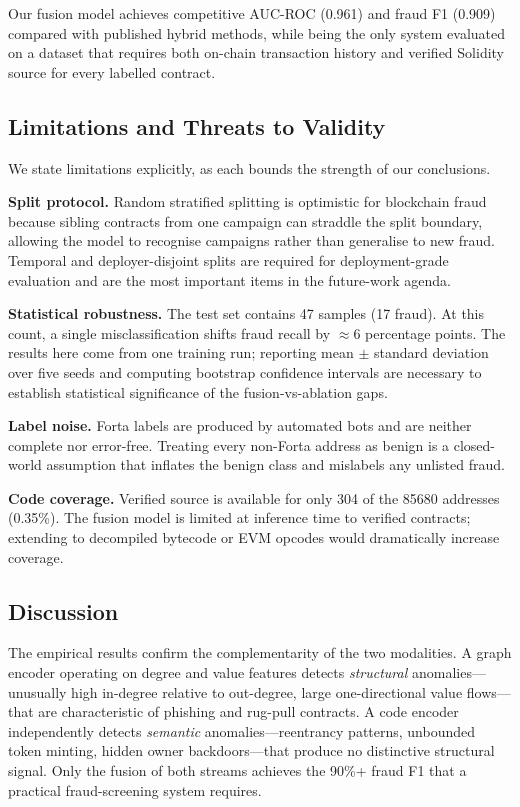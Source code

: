 Our fusion model achieves competitive AUC-ROC (0.961) and fraud F1
(0.909) compared with published hybrid methods, while being the only
system evaluated on a dataset that requires both on-chain transaction
history and verified Solidity source for every labelled contract.

\subsection{Limitations and Threats to Validity}
\label{subsec:limitations}

We state limitations explicitly, as each bounds the strength of
our conclusions.

\textbf{Split protocol.}  Random stratified splitting is optimistic for
blockchain fraud because sibling contracts from one campaign can straddle
the split boundary, allowing the model to recognise campaigns rather than
generalise to new fraud.  Temporal and deployer-disjoint splits are
required for deployment-grade evaluation and are the most important items
in the future-work agenda.

\textbf{Statistical robustness.}  The test set contains 47 samples (17
fraud).  At this count, a single misclassification shifts fraud recall
by $\approx$6 percentage points.  The results here come from one training
run; reporting mean $\pm$ standard deviation over five seeds and computing
bootstrap confidence intervals are necessary to establish statistical
significance of the fusion-vs-ablation gaps.

\textbf{Label noise.}  Forta labels are produced by automated bots and
are neither complete nor error-free.  Treating every non-Forta address as
benign is a closed-world assumption that inflates the benign class and
mislabels any unlisted fraud.

\textbf{Code coverage.}  Verified source is available for only
\num{304} of the \num{85680} addresses (0.35\%).  The fusion model
is limited at inference time to verified contracts; extending to
decompiled bytecode or EVM opcodes would dramatically increase coverage.

\subsection{Discussion}

The empirical results confirm the complementarity of the two modalities.
A graph encoder operating on degree and value features detects
\emph{structural} anomalies---unusually high in-degree relative to
out-degree, large one-directional value flows---that are characteristic
of phishing and rug-pull contracts.  A code encoder independently
detects \emph{semantic} anomalies---reentrancy patterns, unbounded
token minting, hidden owner backdoors---that produce no distinctive
structural signal.  Only the fusion of both streams achieves the 90\%+
fraud F1 that a practical fraud-screening system requires.

